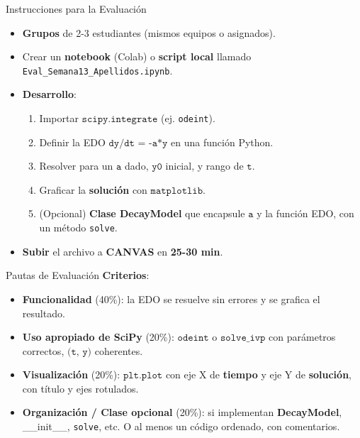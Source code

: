 \documentclass[10pt]{beamer}
\begin{document}
\begin{frame}{Instrucciones para la Evaluación}
  \begin{itemize}
    \item \textbf{Grupos} de 2-3 estudiantes (mismos equipos o asignados).
    \item Crear un \textbf{notebook} (Colab) o \textbf{script local} llamado \texttt{Eval\_Semana13\_Apellidos.ipynb}.
    \item \textbf{Desarrollo}:
      \begin{enumerate}
        \item Importar \(\texttt{scipy.integrate}\) (ej. \texttt{odeint}).
        \item Definir la EDO \(\texttt{dy/dt = -a*y}\) en una función Python.
        \item Resolver para un \(\texttt{a}\) dado, \(\texttt{y0}\) inicial, y rango de \(\texttt{t}\).
        \item Graficar la \textbf{solución} con \(\texttt{matplotlib}\).
        \item (Opcional) \textbf{Clase DecayModel} que encapsule \(\texttt{a}\) y la función EDO, con un método \texttt{solve}.
      \end{enumerate}
    \item \textbf{Subir} el archivo a \textbf{CANVAS} en \textbf{25-30 min}.
  \end{itemize}
\end{frame}

\begin{frame}{Pautas de Evaluación}
  \textbf{Criterios}:
  \begin{itemize}
    \item \textbf{Funcionalidad} (40\%): la EDO se resuelve sin errores y se grafica el resultado.
    \item \textbf{Uso apropiado de SciPy} (20\%): \(\texttt{odeint}\) o \(\texttt{solve\_ivp}\) con parámetros correctos, \(\texttt{(t, y)}\) coherentes.
    \item \textbf{Visualización} (20\%): \(\texttt{plt.plot}\) con eje X de \textbf{tiempo} y eje Y de \textbf{solución}, con título y ejes rotulados.
    \item \textbf{Organización / Clase opcional} (20\%): si implementan \textbf{DecayModel}, \_\_init\_\_, \texttt{solve}, etc. O al menos un código ordenado, con comentarios.
  \end{itemize}
\end{frame}
\end{document}

